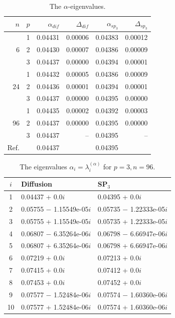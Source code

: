 \documentclass[authoryear]{elsarticle}
\begin{document}
\begin{table}[h]
\caption{The $\alpha$-eigenvalues.}
\label{tab:hwr_alpha_del}
\begin{center}
\begin{tabular}{rrrrrr}
\hline
$n$ & $p$ & $\alpha_{dif}$ & $\Delta_{dif}$ &$\alpha_{sp_3}$& $\Delta_{sp_3}$ \\
\hline
	& 1	&0.04431 & 0.00006 & 0.04383 & 0.00012\\
6	& 2	&0.04430 & 0.00007 & 0.04386 & 0.00009\\
	& 3	&0.04437 & 0.00000 & 0.04394 & 0.00001\\ 
\hline
	& 1	&0.04432 & 0.00005 & 0.04386 & 0.00009\\
24& 2	&0.04436 & 0.00001 & 0.04394 & 0.00001\\
	& 3	&0.04437 & 0.00000 & 0.04395 & 0.00000\\ 
\hline
	& 1	&0.04435 & 0.00002 & 0.04392 & 0.00003\\
96& 2	&0.04437 & 0.00000 & 0.04395 & 0.00000\\
	& 3	&0.04437 & --      & 0.04395 & -- \\ 
\hline
Ref.& & 0.04437 & & 0.04395 \\ 
\hline
\end{tabular}
\end{center}
\end{table}

\begin{table}[h]
\caption{The eigenvalues $\alpha_i=\lambda_i^{(\alpha)}$ for $p=3, n=96$.}
\label{tab:hwr_alpha_del_10}
\begin{center}
\begin{tabular}{c l l}
\hline
$i$ & Diffusion & SP$_3$ \\
\hline
1 &0.04437 + 0.0$i$     		&0.04395 + 0.0$i$ \\
2 &0.05755 $-$ 1.15549e-05$i$ 	&0.05735 $-$ 1.22333e-05$i$ \\
3 &0.05755 + 1.15549e-05$i$   	&0.05735 + 1.22333e-05$i$ \\
4 &0.06807 $-$ 6.35264e-06$i$   &0.06798 $-$ 6.66947e-06$i$ \\
5 &0.06807 + 6.35264e-06$i$     &0.06798 + 6.66947e-06$i$ \\
6 &0.07219 + 0.0$i$             &0.07213 + 0.0$i$ \\
7 &0.07415 + 0.0$i$             &0.07412 + 0.0$i$ \\
8 &0.07453 + 0.0$i$          	&0.07452 + 0.0$i$ \\
9 &0.07577 $-$ 1.52484e-06$i$   &0.07574 $-$ 1.60360e-06$i$ \\
10&0.07577 + 1.52484e-06$i$     &0.07574 + 1.60360e-06$i$ \\
\hline
\end{tabular}
\end{center}
\end{table}
\end{document}
